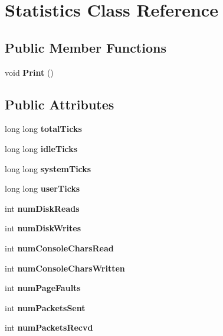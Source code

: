\section{Statistics Class Reference}
\label{class_statistics}
\subsection*{Public Member Functions}
\begin{DoxyCompactItemize}
\item 
void {\bfseries Print} ()\label{class_statistics_ade67669fb1436e69a215a780b1ade63e}

\end{DoxyCompactItemize}
\subsection*{Public Attributes}
\begin{DoxyCompactItemize}
\item 
long long {\bfseries total\+Ticks}\label{class_statistics_a58b71304ed886f7b6bf4f0a098de95d6}

\item 
long long {\bfseries idle\+Ticks}\label{class_statistics_a93f73fe07546a65cccc257fe36d22f7d}

\item 
long long {\bfseries system\+Ticks}\label{class_statistics_a1b863346650d845fd66c2a82edc821b3}

\item 
long long {\bfseries user\+Ticks}\label{class_statistics_abf5ff8cdf5bca15c2a48eb48e11a15a8}

\item 
int {\bfseries num\+Disk\+Reads}\label{class_statistics_a50d57d5c9a5a6b07aa22ad8362259f9e}

\item 
int {\bfseries num\+Disk\+Writes}\label{class_statistics_a5c1854b002d360cdb1dff4438fa6e30f}

\item 
int {\bfseries num\+Console\+Chars\+Read}\label{class_statistics_ab5ea51542ab83433169760d71452a305}

\item 
int {\bfseries num\+Console\+Chars\+Written}\label{class_statistics_a67aa7a06b0933ad257608174f3123e6e}

\item 
int {\bfseries num\+Page\+Faults}\label{class_statistics_a0178d49a84e5dcc4a7672dc973e8f586}

\item 
int {\bfseries num\+Packets\+Sent}\label{class_statistics_a7ccdb4de272140b26cf54efc5dec5cf0}

\item 
int {\bfseries num\+Packets\+Recvd}\label{class_statistics_a0907df803623b828b76be1efba2d3c56}

\end{DoxyCompactItemize}


